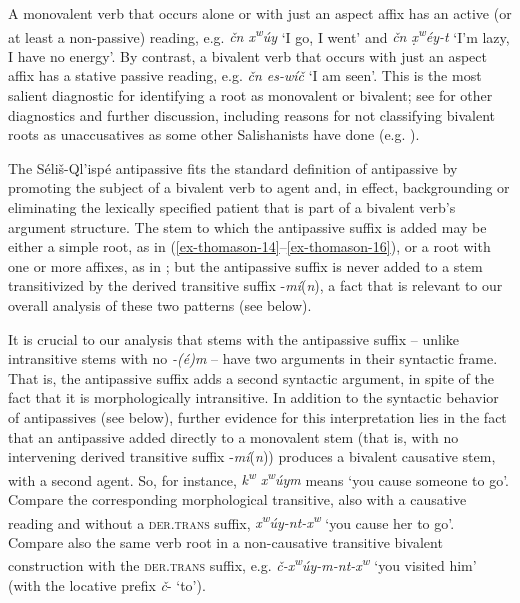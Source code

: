 \documentclass[output=paper,colorlinks,citecolor=brown]{langscibook}
\begin{document}
A monovalent verb that occurs alone or with just an aspect affix has
an active (or at least a non-passive) reading, e.g. \emph{\v{c}n
 x\textsuperscript w\'uy} `I go, I went' and \emph{\v{c}n
 \d{x}\textsuperscript w\'ey-t} `I'm lazy, I have no energy'.  By
contrast, a bivalent verb that occurs with just an aspect affix has a
stative passive reading, e.g. \emph{\v{c}n es-w\'i\v{c}} `I am seen'.
This is the most salient diagnostic for identifying a root as
monovalent or bivalent; see  for other diagnostics
and further discussion, including reasons for not classifying bivalent
roots as unaccusatives as some other Salishanists have done
(e.g. \citealt{Gerdts:1991}).


The S\'eli\v{s}-Ql'isp\'e antipassive fits the standard definition of
antipassive by promoting the subject of a bivalent verb to agent and,
in effect, backgrounding or eliminating the lexically specified
patient that is part of a bivalent verb's argument structure.  The
stem to which the antipassive suffix is added may be either a simple
root, as in (\ref{ex-thomason-14}--\ref{ex-thomason-16}), 
or a root with one or more affixes, as in ; but
the antipassive suffix is never added to a stem transitivized by the
derived transitive suffix -\emph{m\'i}(\emph{n}), a fact that is
relevant to our overall analysis of these two patterns (see 
below).


It is crucial to our analysis that stems with the antipassive
suffix -- unlike intransitive stems with no \emph{-(\'e)m} -- have two
arguments in their syntactic frame.  That is, the antipassive suffix
adds a second syntactic argument, in spite of the fact that it is
morphologically intransitive.  In addition to the syntactic behavior
of antipassives (see below), further evidence for this interpretation
lies in the fact that an antipassive added directly to a monovalent
stem (that is, with no intervening derived transitive suffix -\emph{m\'i}(\emph{n})) produces a bivalent causative stem, with a second
agent.  So, for instance, \emph{{k\textsuperscript w} x\textsuperscript
 w\'uym} means `you cause someone to go'.  Compare the corresponding
morphological transitive, also with a causative reading and without a
\textsc{der.trans} suffix, \emph{x\textsuperscript
 w\'uy-nt-x\textsuperscript w} `you cause her to go'.  Compare also the
same verb root in a non-causative transitive bivalent construction
with the \textsc{der.trans} suffix, e.g. \emph{\v{c}-x\textsuperscript
 w\'uy-m-nt-x\textsuperscript w} `you visited him' (with the locative
prefix \emph{\v{c}}- `to').
\end{document}
